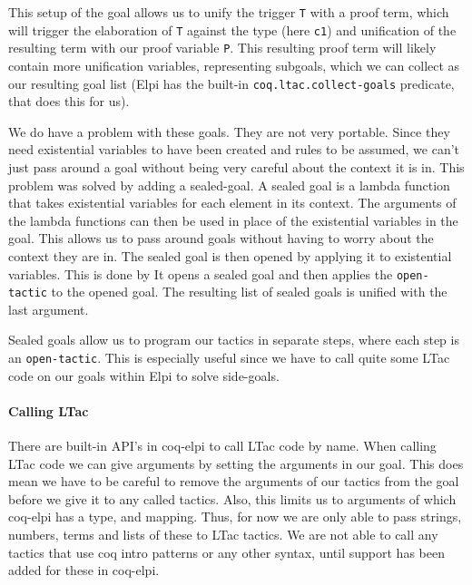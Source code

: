 \documentclass[thesis.tex]{subfiles}
\begin{document}
This setup of the goal allows us to unify the trigger \texttt{T} with a proof term, which will trigger the elaboration of \texttt{T} against the type (here \texttt{c1}) and unification of the resulting term with our proof variable \texttt{P}. This resulting proof term will likely contain more unification variables, representing subgoals, which we can collect as our resulting goal list (Elpi has the built-in \texttt{coq.ltac.collect-goals} predicate, that does this for us).

We do have a problem with these goals. They are not very portable. Since they need existential variables to have been created and rules to be assumed, we can't just pass around a goal without being very careful about the context it is in. This problem was solved by adding a sealed-goal. A sealed goal is a lambda function that takes existential variables for each element in its context. The arguments of the lambda functions can then be used in place of the existential variables in the goal. This allows us to pass around goals without having to worry about the context they are in. The sealed goal is then opened by applying it to existential variables. This is done by  It opens a sealed goal and then applies the \texttt{open-tactic} to the opened goal. The resulting list of sealed goals is unified with the last argument.

Sealed goals allow us to program our tactics in separate steps, where each step is an \texttt{open-tactic}. This is especially useful since we have to call quite some LTac code on our goals within Elpi to solve side-goals.

\paragraph*{Calling LTac}
There are built-in API's in coq-elpi to call LTac code by name. When calling LTac code we can give arguments by setting the arguments in our goal. This does mean we have to be careful to remove the arguments of our tactics from the goal before we give it to any called tactics. Also, this limits us to arguments of which coq-elpi has a type, and mapping. Thus, for now we are only able to pass strings, numbers, terms and lists of these to LTac tactics. We are not able to call any tactics that use coq intro patterns or any other syntax, until support has been added for these in coq-elpi.
\end{document}
